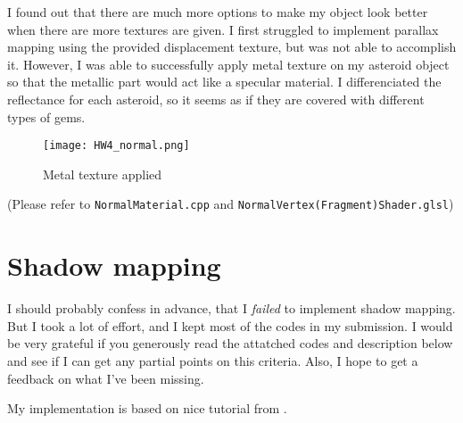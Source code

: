 \documentclass[10pt,a4paper]{article}
\begin{document}
	I found out that there are much more options to make my object look better when there are more textures are given. I first struggled to implement parallax mapping \cite{parallax_mapping} using the provided displacement texture, but was not able to accomplish it. However, I was able to successfully apply metal texture on my asteroid object so that the metallic part would act like a specular material. I differenciated the reflectance for each asteroid, so it seems as if they are covered with different types of gems.
	
	\begin{figure}[h]
		\centering
		\texttt{[image: HW4\_normal.png]}
		\caption{Metal texture applied}
		\label{fig:metal}
	\end{figure}

	\begin{flushright}
		(Please refer to \texttt{NormalMaterial.cpp} and \texttt{NormalVertex(Fragment)Shader.glsl})
	\end{flushright}
	
	\pagebreak
	\section{Shadow mapping}
	
	I should probably confess in advance, that I \textit{failed} to implement shadow mapping. But I took a lot of effort, and I kept most of the codes in my submission. I would be very grateful if you generously read the attatched codes and description below and see if I can get any partial points on this criteria. Also, I hope to get a feedback on what I've been missing.
	
	My implementation is based on nice tutorial from \cite{shadow_mapping}.
	
\end{document}
